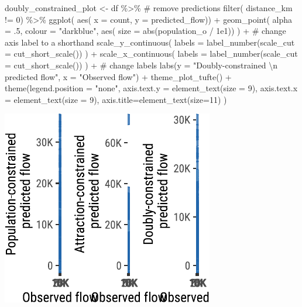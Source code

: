 \documentclass[
  a4paper, 
  twoside,
  final
]{article}
\newenvironment{Shaded}{\begin{snugshade}}{\end{snugshade}}
\newcommand{\AttributeTok}[1]{\textcolor[rgb]{0.40,0.45,0.13}{#1}}
\newcommand{\CommentTok}[1]{\textcolor[rgb]{0.37,0.37,0.37}{#1}}
\newcommand{\DecValTok}[1]{\textcolor[rgb]{0.68,0.00,0.00}{#1}}
\newcommand{\FloatTok}[1]{\textcolor[rgb]{0.68,0.00,0.00}{#1}}
\newcommand{\FunctionTok}[1]{\textcolor[rgb]{0.28,0.35,0.67}{#1}}
\newcommand{\NormalTok}[1]{\textcolor[rgb]{0.00,0.23,0.31}{#1}}
\newcommand{\OtherTok}[1]{\textcolor[rgb]{0.00,0.23,0.31}{#1}}
\newcommand{\SpecialCharTok}[1]{\textcolor[rgb]{0.37,0.37,0.37}{#1}}
\newcommand{\StringTok}[1]{\textcolor[rgb]{0.13,0.47,0.30}{#1}}
\begin{document}
\begin{Shaded}
\begin{Highlighting}[]
\NormalTok{doubly\_constrained\_plot }\OtherTok{\textless{}{-}}\NormalTok{ df }\SpecialCharTok{\%\textgreater{}\%} 
  \CommentTok{\# remove predictions}
  \FunctionTok{filter}\NormalTok{( distance\_km }\SpecialCharTok{!=} \DecValTok{0}\NormalTok{) }\SpecialCharTok{\%\textgreater{}\%} 
  \FunctionTok{ggplot}\NormalTok{( }\FunctionTok{aes}\NormalTok{( }\AttributeTok{x =}\NormalTok{ count, }\AttributeTok{y =}\NormalTok{ predicted\_flow)) }\SpecialCharTok{+}
  \FunctionTok{geom\_point}\NormalTok{( }\AttributeTok{alpha =}\NormalTok{ .}\DecValTok{5}\NormalTok{, }\AttributeTok{colour =} \StringTok{"darkblue"}\NormalTok{,}
              \FunctionTok{aes}\NormalTok{( }\AttributeTok{size =} \FunctionTok{abs}\NormalTok{(population\_o }\SpecialCharTok{/} \FloatTok{1e1}\NormalTok{)) ) }\SpecialCharTok{+}
  \CommentTok{\# change axis label to a shorthand}
  \FunctionTok{scale\_y\_continuous}\NormalTok{(}
    \AttributeTok{labels =} \FunctionTok{label\_number}\NormalTok{(}\AttributeTok{scale\_cut =} \FunctionTok{cut\_short\_scale}\NormalTok{())}
\NormalTok{    ) }\SpecialCharTok{+} 
  \FunctionTok{scale\_x\_continuous}\NormalTok{(}
    \AttributeTok{labels =} \FunctionTok{label\_number}\NormalTok{(}\AttributeTok{scale\_cut =} \FunctionTok{cut\_short\_scale}\NormalTok{())}
\NormalTok{    ) }\SpecialCharTok{+} 
  \CommentTok{\# change labels}
  \FunctionTok{labs}\NormalTok{(}\AttributeTok{y =} \StringTok{"Doubly{-}constrained }\SpecialCharTok{\textbackslash{}n}\StringTok{ predicted flow"}\NormalTok{,}
       \AttributeTok{x =} \StringTok{"Observed flow"}\NormalTok{) }\SpecialCharTok{+}
  \FunctionTok{theme\_plot\_tufte}\NormalTok{() }\SpecialCharTok{+}
  \FunctionTok{theme}\NormalTok{(}\AttributeTok{legend.position =} \StringTok{"none"}\NormalTok{,}
        \AttributeTok{axis.text.y =} \FunctionTok{element\_text}\NormalTok{(}\AttributeTok{size =} \DecValTok{9}\NormalTok{),}
        \AttributeTok{axis.text.x =} \FunctionTok{element\_text}\NormalTok{(}\AttributeTok{size =} \DecValTok{9}\NormalTok{),}
        \AttributeTok{axis.title=}\FunctionTok{element\_text}\NormalTok{(}\AttributeTok{size=}\DecValTok{11}\NormalTok{)}
\NormalTok{        )}
\end{Highlighting}
\end{Shaded}

\includegraphics{region-quarto-template_files/figure-pdf/unnamed-chunk-9-1.pdf}
\end{document}
